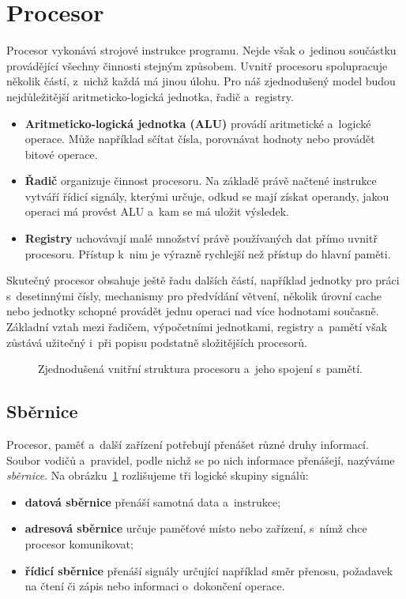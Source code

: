 \section{Procesor}\label{sec:hw-procesor}

Procesor vykonává strojové instrukce programu. Nejde však o~jedinou součástku provádějící všechny činnosti stejným způsobem. Uvnitř procesoru spolupracuje několik částí, z~nichž každá má jinou úlohu. Pro náš zjednodušený model budou nejdůležitější aritmeticko-logická jednotka, řadič a~registry.

\begin{itemize}
    \item \textbf{Aritmeticko-logická jednotka (ALU)} provádí aritmetické a~logické operace. Může například sčítat čísla, porovnávat hodnoty nebo provádět bitové operace.
    \item \textbf{Řadič} organizuje činnost procesoru. Na základě právě načtené instrukce vytváří řídicí signály, kterými určuje, odkud se mají získat operandy, jakou operaci má provést ALU a~kam se má uložit výsledek.
    \item \textbf{Registry} uchovávají malé množství právě používaných dat přímo uvnitř procesoru. Přístup k~nim je výrazně rychlejší než přístup do hlavní paměti.
\end{itemize}

Skutečný procesor obsahuje ještě řadu dalších částí, například jednotky pro práci s~desetinnými čísly, mechanismy pro předvídání větvení, několik úrovní cache nebo jednotky schopné provádět jednu operaci nad více hodnotami současně. Základní vztah mezi řadičem, výpočetními jednotkami, registry a~pamětí však zůstává užitečný i~při popisu podstatně složitějších procesorů.

\begin{figure}[ht]
    \centering
    
    \caption{Zjednodušená vnitřní struktura procesoru a~jeho spojení s~pamětí.}
    \label{fig:hw-cpu-sbernice}
\end{figure}

\subsection{Sběrnice}\label{subsec:hw-sbernice}

Procesor, paměť a~další zařízení potřebují přenášet různé druhy informací. Soubor vodičů a~pravidel, podle nichž se po nich informace přenášejí, nazýváme \emph{sběrnice}. Na obrázku~\ref{fig:hw-cpu-sbernice} rozlišujeme tři logické skupiny signálů:
\begin{itemize}
    \item \textbf{datová sběrnice} přenáší samotná data a~instrukce;
    \item \textbf{adresová sběrnice} určuje paměťové místo nebo zařízení, s~nímž chce procesor komunikovat;
    \item \textbf{řídicí sběrnice} přenáší signály určující například směr přenosu, požadavek na čtení či zápis nebo informaci o~dokončení operace.
\end{itemize}

